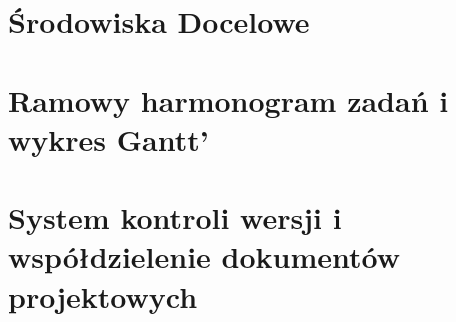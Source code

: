 



\section{Środowiska Docelowe}
\label{sec:srodowiska-docelowe}

\section{Ramowy harmonogram zadań i wykres Gantt’}
\label{sec:ramowy-harmonogram-zadan-i-wykres-gantt’}


\section{ System kontroli wersji i współdzielenie dokumentów projektowych}
\label{sec:-system-kontroli-wersji-i-wspoldzielenie-dokumentow-projektowych}
